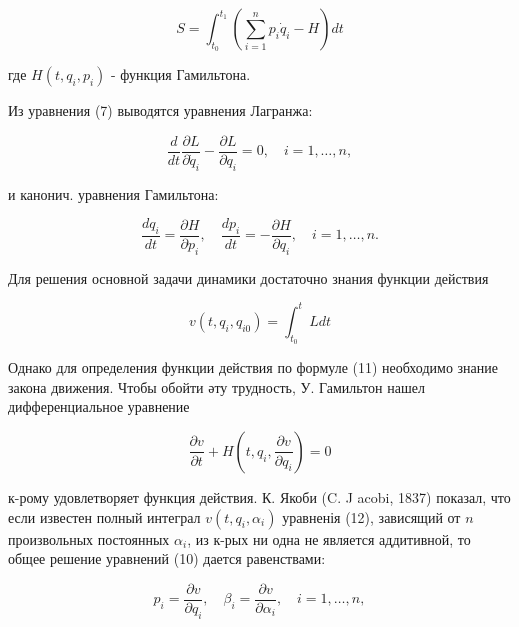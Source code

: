 \documentclass[10pt]{article}
\begin{document}
\[

S=\int_{t_{0}}^{t_{1}}\left(\sum_{i=1}^{n} p_{i} \dot{q}_{i}-H\right) d t

\]



где $H\left(t, q_{i}, p_{i}\right)$ - функция Гамильтона.



Из уравнения (7) выводятся уравнения Лагранжа:



\[

\frac{d}{d t} \frac{\partial L}{\partial \dot{q}_{i}}-\frac{\partial L}{\partial q_{i}}=0, \quad i=1, \ldots, n,

\]



и канонич. уравнения Гамильтона:



\[

\frac{d q_{i}}{d t}=\frac{\partial H}{\partial p_{i}}, \quad \frac{d p_{i}}{d t}=-\frac{\partial H}{\partial q_{i}}, \quad i=1, \ldots, n .

\]



Для решения основной задачи динамики достаточно знания функции действия



\[

v\left(t, q_{i}, q_{i 0}\right)=\int_{t_{0}}^{t} L d t

\]



Однако для определения функции действия по формуле (11) необходимо знание закона движения. Чтобы обойти әту трудность, У. Гамильтон нашел дифференциальное уравнение



\[

\frac{\partial v}{\partial t}+H\left(t, q_{i}, \frac{\partial v}{\partial q_{i}}\right)=0

\]



к-рому удовлетворяет функция действия. К. Якоби (C. J acobi, 1837) показал, что если известен полный интеграл $v\left(t, q_{i}, \alpha_{i}\right)$ уравненія (12), зависящий от $n$ произвольных постоянных $\alpha_{i}$, из к-рых ни одна не является аддитивной, то общее решение уравнений (10) дается равенствами:



\[

p_{i}=\frac{\partial v}{\partial q_{i}}, \quad \beta_{i}=\frac{\partial v}{\partial \alpha_{i}}, \quad i=1, \ldots, n,

\]
\end{document}
